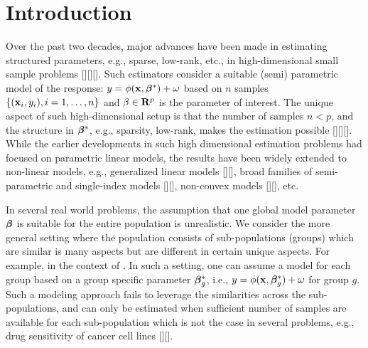 
\section{Introduction}
Over the past two decades, major advances have been made in estimating structured parameters, e.g., sparse, low-rank, etc., in high-dimensional small sample problems [][][].
Such estimators consider a suitable (semi) parametric model of the response: $y = \phi(\mathbf{x},\boldsymbol{\beta}^*) + \omega$ based on $n$ samples $\{(\mathbf{x}_i,y_i),i=1,\ldots,n\}$ and $\beta \in \mathbf{R}^p$
is the parameter of interest. The unique aspect of such high-dimensional setup is that the number of samples $n < p$, and the structure in $\boldsymbol{\beta}^*$, e.g., sparsity, low-rank, makes
the estimation possible [][][]. While the earlier developments in such high dimensional estimation problems had focused on parametric linear models, the results
have been widely extended to non-linear models, e.g., generalized linear models [][], broad families of semi-parametric and single-index models [][], non-convex models [][], etc.

In several real world problems, the assumption that one global model parameter $\boldsymbol{\beta}$ is suitable for the entire population is unrealistic.
We consider the more general setting where the population consists of sub-populations (groups) which are similar is many aspects but are different in certain
unique aspects. For example, in the context of . 
%
%
In such a setting, one can assume a model for each group based on a group specific parameter $\boldsymbol{\beta}^*_g$, i.e., $y = \phi(\mathbf{x}, \boldsymbol{\beta}_g^*) + \omega$ for group $g$. 
Such a modeling approach fails to leverage the similarities across the sub-populations, and can only be estimated when sufficient number of samples are available 
for each sub-population which is not the case in several problems, e.g., drug sensitivity of cancer cell lines [][].
%

